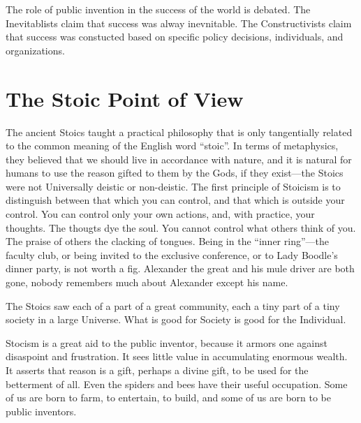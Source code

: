 \documentclass[
	fontsize=10pt, %
	twoside=false, %
	secnumdepth=1, %
]{kaobook}
\begin{document}
The role of public invention in the success of the world is
debated. The Inevitablists claim that success was alway inevnitable.
The Constructivists claim that success was constucted based on
specific policy decisions, individuals, and organizations.

\chapter{The Stoic Point of View}

The ancient Stoics taught a practical philosophy that is only
tangentially related to the common meaning of the English word ``stoic''.
In terms of metaphysics, they believed that we should live in accordance with nature, and it is natural for humans
to use the reason gifted to them by the Gods, if they exist---the Stoics were not
Universally deistic or non-deistic.
The first principle of Stoicism is to
distinguish between that which you can control, and that
which is outside your control.
You can control only your own actions, and, with practice,
your thoughts. The thougts dye the soul.
You cannot control what others think of you.
The praise of others the clacking of tongues.
Being in the ``inner ring''---the faculty club,
or being invited to the exclusive conference, or
to Lady Boodle's dinner party, is not worth a fig.
Alexander the great and his mule driver are both gone,
nobody remembers much about Alexander except his name.

The Stoics saw each of a part of a great community, each a
tiny part of a tiny society in a large Universe.
What is good for Society is good for the Individual.

Stocism is a great aid to the public inventor,
because it armors one against disaspoint and frustration.
It sees little value in accumulating enormous wealth.
It asserts that reason is a gift, perhaps a divine gift,
to be used for the betterment of all.
Even the spiders and bees have their useful occupation.
Some of us are born to farm, to entertain, to build, and
some of us are born to be public inventors.
\end{document}
